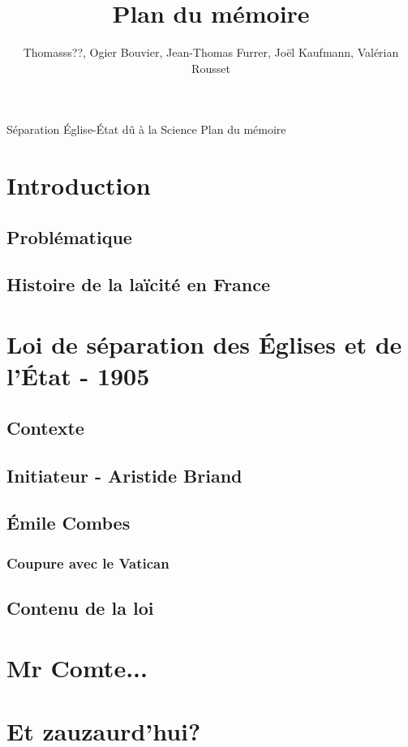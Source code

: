 \documentclass{article}
\title{Plan du m\'emoire}
\author{Thomasss??, Ogier Bouvier, Jean-Thomas Furrer, Jo\"el Kaufmann, Val\'erian Rousset}
\begin{document}
\maketitle

\begin{center}
\LARGE{S\'eparation \'Eglise-\'Etat d\^u à la Science}
\LARGE{Plan du m\'emoire}
\end{center}

\section{Introduction}
\subsection{Probl\'ematique}
\subsection{Histoire de la la\"icit\'e en France}

\section{Loi de s\'eparation des \'Eglises et de l'\'Etat - 1905}
\subsection{Contexte}
\subsection{Initiateur - Aristide Briand}
\subsection{\'Emile Combes}
\subsubsection{Coupure avec le Vatican}
\subsection{Contenu de la loi}

\section{Mr Comte...}
\section{Et zauzaurd'hui?}
\end{document}
